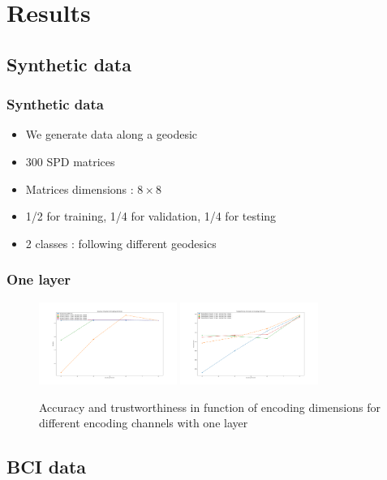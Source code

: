 \documentclass{beamer}
\begin{document}
\section{Results}

\subsection{Synthetic data}
\begin{frame}
\frametitle{Synthetic data}
\begin{itemize}
    \item We generate data along a geodesic
    \item 300 SPD matrices
    \item Matrices dimensions : $8 \times 8$
    \item 1/2 for training, 1/4 for validation, 1/4 for testing
    \item 2 classes : following different geodesics
\end{itemize}
\end{frame}

\begin{frame}
    \frametitle{One layer}
    \begin{figure}
        \centering
        \includegraphics[width=0.4\textwidth]{figures/acc_no_noise_geodesics.png}
        \includegraphics[width=0.4\textwidth]{figures/trustworthiness_geodesics.png}
        \caption{Accuracy and trustworthiness in function of encoding dimensions for different encoding channels with one layer}
    \end{figure}
\end{frame}
\subsection{BCI data}
\end{document}
